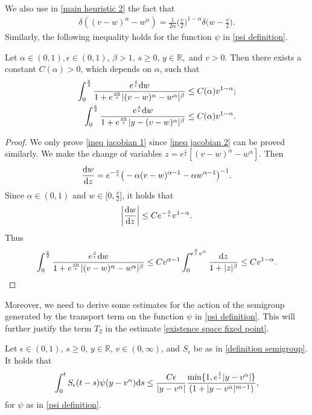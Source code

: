 \documentclass[11pt]{article}
\numberwithin{equation}{section}
\newcommand{\der}{\textup{d}}
\begin{document}
We also use in \eqref{main heuristic 2} the fact that
\begin{align*}
\delta((v-w)^{\alpha}-w^{\alpha})=\frac{1}{2\alpha }\Big(\frac{v}{2}\Big)^{1-\alpha}\delta\Big(w-\frac{v}{2}\Big).
\end{align*}
Similarly, the following inequality holds for the function $\psi$ in \eqref{psi definition}.
\begin{lem}\label{ref lemma dirac v-w v}
Let $\alpha\in(0,1), \epsilon\in(0,1)$, $\beta>1$, $s\geq 0$, $y\in\mathbb{R},$ and $v>0$. Then there exists a constant $C(\alpha)>0$, which depends on $\alpha$, such that 
    \begin{align}
      \int_{0}^{\frac{v}{2}} \frac{e^{\frac{s}{\epsilon}}\der w}{1+e^{\frac{sn}{\epsilon}}|(v-w)^{\alpha}-w^{\alpha}|^{\beta}}&\leq C(\alpha) v^{1-\alpha};\label{ineq jacobian 1}\\
       \int_{0}^{\frac{v}{2}} \frac{e^{\frac{s}{\epsilon}}\der w}{1+e^{\frac{sn}{\epsilon}}|y-(v-w)^{\alpha}|^{\beta}}&\leq C(\alpha) v^{1-\alpha}.\label{ineq jacobian 2}
    \end{align} 
\end{lem}
\begin{proof}
We only prove \eqref{ineq jacobian 1} since \eqref{ineq jacobian 2} can be proved similarly. We make the change of variables $z=e^{\frac{s}{\epsilon}}[(v-w)^{\alpha}-w^{\alpha}]$. Then 
\begin{align*}
    \frac{\der w}{\der z}=e^{-\frac{s}{\epsilon}}\big(-\alpha (v-w)^{\alpha-1}-\alpha w^{\alpha-1}\big)^{-1}.
\end{align*} 
Since $\alpha\in(0,1)$ and $w\in\big[0,\frac{v}{2}\big]$, it holds that
\begin{align*}
    \bigg|\frac{\der w}{\der z}\bigg|\leq C e^{-\frac{s}{\epsilon}} v^{1-\alpha}.
\end{align*}
Thus
    \begin{align*}
      \int_{0}^{\frac{v}{2}} \frac{e^{\frac{s}{\epsilon}}\der w}{1+e^{\frac{sn}{\epsilon}}|(v-w)^{\alpha}-w^{\alpha}|^{\beta}}\leq Cv^{\alpha-1} \int_{0}^{e^{\frac{s}{\epsilon}} v^{\alpha}}\frac{\der z}{1+|z|^{\beta}}\leq C v^{1-\alpha}.  
    \end{align*} 
\end{proof}
Moreover, we need to derive some estimates for the action of the semigroup generated by the transport term on the function $\psi$ in \eqref{psi definition}. This will further justify the term $T_{2}$ in the estimate \eqref{existence space fixed point}.
\begin{prop}\label{prop semigroup decay}
Let $\epsilon\in(0,1)$, $s\geq 0$, $y\in\mathbb{R}$,  $v\in(0,\infty)$, and $S_{\epsilon}$ be as in \eqref{definition semigroup}. It holds that
\begin{align}\label{estimate for psi}
    \int_{0}^{t}S_{\epsilon}(t-s) \psi(y-v^{\alpha})\der s\leq \frac{C \epsilon}{|y-v^{\alpha}|}\frac{\min\{1,e^{\frac{t}{\epsilon}}|y-v^{\alpha}|\}}{(1+|y-v^{\alpha}|^{m-1})},
\end{align}
for $\psi$ as in \eqref{psi definition}.
\end{prop}
\end{document}
